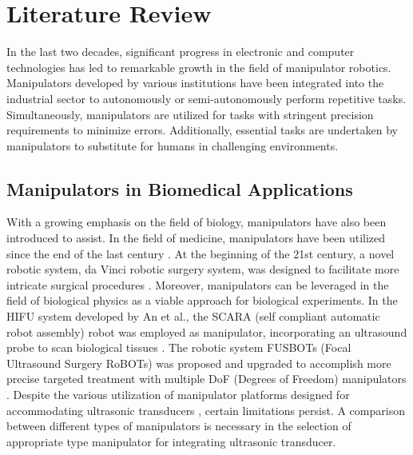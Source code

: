 \section{Literature Review} 
In the last two decades, significant progress in electronic and computer technologies has led to remarkable 
growth in the field of manipulator robotics. Manipulators developed by various institutions have been integrated 
into the industrial sector to autonomously or semi-autonomously perform repetitive tasks. Simultaneously, 
manipulators are utilized for tasks with stringent precision requirements to minimize errors. Additionally, 
essential tasks are undertaken by manipulators to substitute for humans in challenging environments. 
\subsection{Manipulators in Biomedical Applications}
With a growing emphasis on the field of biology, manipulators have also been introduced to assist. 
In the field of medicine, manipulators have been utilized since the end of the last century 
\cite{AESOP,ZEUS,ZEUS_example1,ZEUS_example2,ZEUS_example3}. At the beginning of the 21st century, a novel 
robotic system, da Vinci robotic surgery system, was designed to facilitate more intricate surgical procedures 
\cite{da_Vinci}. Moreover, manipulators can be leveraged in the field of biological physics as a viable approach 
for biological experiments. In the HIFU system developed by An et al., the SCARA (self compliant automatic robot 
assembly) robot was employed as manipulator, incorporating an ultrasound probe to scan 
biological tissues \cite{HIFU2017}. The robotic system FUSBOTs (Focal Ultrasound Surgery RoBOTs) was proposed 
and upgraded to accomplish more precise targeted treatment with multiple DoF (Degrees of Freedom) manipulators 
\cite{FUSBOT,FUSBOT_example1,FUSBOT_example2}. Despite the various utilization of manipulator platforms 
designed for accommodating ultrasonic transducers \cite{6DOF_HIFU,6DOF_HIFU_comp,6DOF_HIFU_ABB}, 
certain limitations persist. A comparison between different types of manipulators is necessary in the 
selection of appropriate type manipulator for integrating ultrasonic transducer. 
